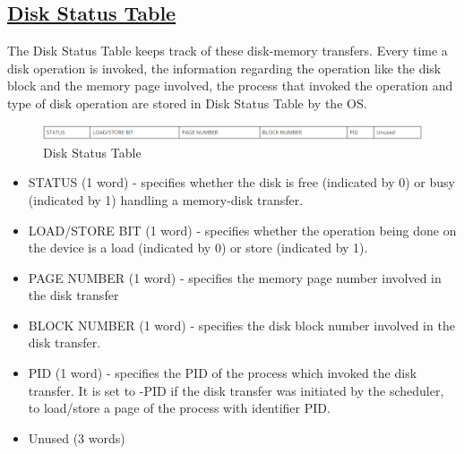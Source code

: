 \subsection{\href{http://exposnitc.github.io/os_design-files/mem_ds.html#ds_table}{Disk Status Table}}
The Disk Status Table keeps track of these disk-memory transfers. Every time a disk operation is invoked, the information regarding the operation like the disk block and the memory page involved, the process that invoked the operation and type of disk operation are stored in Disk Status Table by the OS.
\begin{figure}[ht]
\centering
\includegraphics  [scale=0.55]{figures/ds.png}
\caption{\footnotesize Disk Status Table}
\end{figure}
\begin {itemize}

\item STATUS (1 word) - specifies whether the disk is free (indicated by 0) or busy (indicated by 1) handling a memory-disk transfer.
\item LOAD/STORE BIT (1 word) - specifies whether the operation being done on the device is a load (indicated by 0) or store (indicated by 1).
\item PAGE NUMBER (1 word) - specifies the memory page number involved in the disk transfer
\item BLOCK NUMBER (1 word) - specifies the disk block number involved in the disk transfer.
\item PID (1 word) - specifies the PID of the process which invoked the disk transfer. It is set to -PID if the disk transfer was initiated by the scheduler, to load/store a page of the process with identifier PID.
\item Unused (3 words)

\end {itemize}

